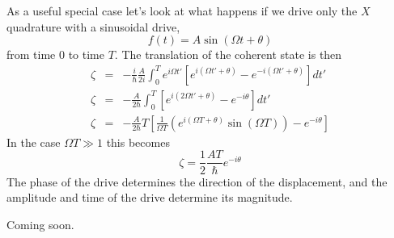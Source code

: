 As a useful special case let's look at what happens if we drive only the $X$ quadrature with a sinusoidal drive, \begin{equation}
f(t)=A\sin\left(\Omega t+\theta\right) \end{equation}
from time $0$ to time $T$. The translation of the coherent state is then\begin{eqnarray*}
\zeta & = & -\frac{i}{\hbar}\frac{A}{2i}\int_{0}^{T}e^{i\Omega t'}\left[e^{i(\Omega t'+\theta)}-e^{-i(\Omega t'+\theta)}\right]dt'\\
\zeta & = & -\frac{A}{2\hbar}\int_{0}^{T}\left[e^{i(2\Omega t'+\theta)}-e^{-i\theta}\right]dt'\\
\zeta & = & -\frac{A}{2\hbar}T\left[\frac{1}{\Omega T}\left(e^{i(\Omega T+\theta)}\sin\left(\Omega T\right)\right)-e^{-i\theta}\right]\end{eqnarray*}
In the case $\Omega T\gg1$ this becomes \begin{equation}
\zeta=\frac{1}{2}\frac{AT}{\hbar}e^{-i\theta} \end{equation}
The phase of the drive determines the direction of the displacement, and the amplitude and time of the drive determine its magnitude.



Coming soon.

